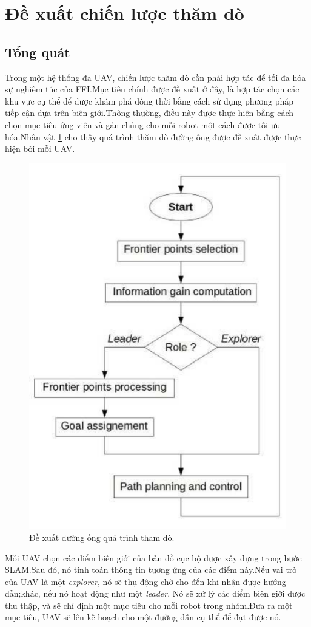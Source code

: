 \documentclass[11pt,openany]{book}
\begin{document}
\section{Đề xuất chiến lược thăm dò}
\subsection{Tổng quát}
Trong một hệ thống đa UAV, chiến lược thăm dò cần phải hợp tác để tối đa hóa sự nghiêm túc của FFI.Mục tiêu chính được đề xuất ở đây, là hợp tác chọn các khu vực cụ thể để được khám phá đồng thời bằng cách sử dụng phương pháp tiếp cận dựa trên biên giới.Thông thường, điều này được thực hiện bằng cách chọn mục tiêu ứng viên và gán chúng cho mỗi robot một cách được tối ưu hóa.Nhân vật \ref{fig:3.1} cho thấy quá trình thăm dò đường ống được đề xuất được thực hiện bởi mỗi UAV.
\begin{figure}[H]
    \centering
    \includegraphics[scale=0.6]{assets/3_1.png}
    \caption{Đề xuất đường ống quá trình thăm dò.}
    \label{fig:3.1}
\end{figure}
Mỗi UAV chọn các điểm biên giới của bản đồ cục bộ được xây dựng trong bước SLAM.Sau đó, nó tính toán thông tin tương ứng của các điểm này.Nếu vai trò của UAV là một \textit{explorer}, nó sẽ thụ động chờ cho đến khi nhận được hướng dẫn;khác, nếu nó hoạt động như một \textit{leader}, Nó sẽ xử lý các điểm biên giới được thu thập, và sẽ chỉ định một mục tiêu cho mỗi robot trong nhóm.Đưa ra một mục tiêu, UAV sẽ lên kế hoạch cho một đường dẫn cụ thể để đạt được nó.\\\\
\end{document}
